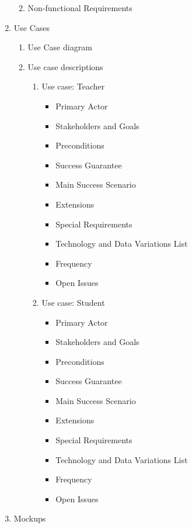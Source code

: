 \documentclass{article}
\begin{document}
\begin{enumerate}
\begin{enumerate}
\begin{enumerate}
\begin{enumerate}
				 
			\end{enumerate}
		\end{enumerate}
		\item{Non-functional Requirements}
	\end{enumerate}
	\item{Use Cases}
	\begin{enumerate}
		\item{Use Case diagram}
		\item{Use case descriptions}
		\begin{enumerate}
			\item{Use case: Teacher}
			\begin{itemize}
				\item Primary Actor
				\item Stakeholders and Goals
				\item Preconditions
				\item Success Guarantee
				\item Main Success Scenario
				\item Extensions
				\item Special Requirements
				\item Technology and Data Variations List
				\item Frequency
				\item Open Issues
			\end{itemize}
			\item{Use case: Student}
			
			
			
			\begin{itemize}
				\item Primary Actor
				\item Stakeholders and Goals
				\item Preconditions
				\item Success Guarantee
				\item Main Success Scenario
				\item Extensions
				\item Special Requirements
				\item Technology and Data Variations List
				\item Frequency
				\item Open Issues
				
			\end{itemize}
		\end{enumerate}
	\end{enumerate}
	\item{Mockups}
	

\end{enumerate}
\end{document}
